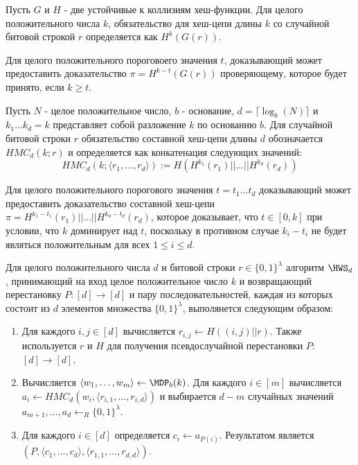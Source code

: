 \begin{definition}
Пусть $G$ и $H$ - две устойчивые к коллизиям хеш-функции.
Для целого положительного числа $k$, обязательство для хеш-цепи длины $k$ со случайной битовой строкой $r$ определяется как $H^k(G(r))$.
\end{definition}

\begin{definition}
Для целого положительного пороговоего значения $t$, доказывающий может предоставить доказательство $\pi = H^{k - t}(G(r))$ проверяющему, которое будет принято, если $k \geq t$.
\end{definition}

\begin{definition}
	Пусть $N$ - целое положительное число, $b$ - основание, $d = \lceil \log_b(N) \rceil$ и $k_1 \dots k_d = k$ представляет собой разложение $k$ по основанию $b$.
	Для случайной битовой строки $r$ обязательство составной хеш-цепи длины $d$ обозначается $HMC_d(k; r)$ и определяется как конкатенация следующих значений:
	$$
	HMC_d(k; \langle r_1, \dots, r_d \rangle) := H(H^{k_1}(r_1) || \dots || H^{k_d}(r_d))
	$$
\end{definition}

\begin{definition}
	Для целого положительного порогового значения $t = t_1 \dots t_d$ доказывающий может предоставить доказательство составной хеш-цепи $\pi = H^{k_1 - t_1}(r_1) || \dots || H^{k_d - t_d}(r_d)$, которое доказывает, что $t \in [0, k]$ при условии, что $k$ доминирует над $t$, поскольку в противном случае $k_i - t_i$ не будет являться положительным для всех $1 \leq i \leq d$.
\end{definition}

\begin{definition}[$\HWS_d$]
	Для целого положительного числа $d$ и битовой строки $r \in \{0, 1\}^\lambda$ алгоритм $\HWS_d$, принимающий на вход целое положительное число $k$ и возвращающий перестановку $P: [d] \rightarrow [d]$ и пару последовательностей, каждая из которых состоит из $d$ элементов множества $\{0, 1\}^\lambda$, выполянется следующим образом:
	\begin{enumerate}
		\item Для каждого $i, j \in [d]$ вычисляется $r_{i, j} \leftarrow H((i, j) || r)$. Также используется $r$ и $H$ для получения псевдослучайной перестановки $P$: $[d] \rightarrow [d]$.
		\item Вычисляется $\langle w_1, \dots, w_m \rangle \leftarrow \MDP_b(k)$. Для каждого $i \in [m]$ вычисляется $a_i \leftarrow HMC_d(w_i, \langle r_{i, 1}, \dots, r_{i, d} \rangle)$ и выбирается $d - m$ случайных значений $a_{m + 1}, \dots, a_d \leftarrow_R \{0, 1\}^\lambda$.
		\item Для каждого $i \in [d]$ определяется $c_i \leftarrow a_{P(i)}$. Результатом является $(P, \langle c_1, \dots, c_d \rangle, \langle r_{1, 1}, \dots, r_{d, d} \rangle)$.
	\end{enumerate}
\end{definition}

